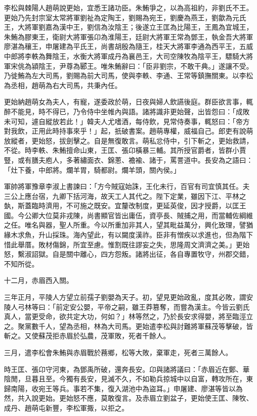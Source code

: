 \begin{pinyinscope}
李松與棘陽人趙萌說更始，宜悉王諸功臣。朱鮪爭之，以為高祖約，非劉氏不王。更始乃先封宗室太常將軍劉祉為定陶王，劉賜為宛王，劉慶為燕王，劉歙為元氏王，大將軍劉嘉為漢中王，劉信為汝陰王；後遂立王匡為比陽王，王鳳為宜城王，朱鮪為膠東王，衛尉大將軍張卬為淮陽王，廷尉大將軍王常為鄧王，執金吾大將軍廖湛為穰王，申屠建為平氏王，尚書胡殷為隨王，桂天大將軍李通為西平王，五威中郎將李軼為舞陰王，水衡大將軍成丹為襄邑王，大司空陳牧為陰平王，驃騎大將軍宋佻為潁陰王，尹尊為郾王。唯朱鮪辭曰：「臣非劉宗，不敢干典。」遂讓不受。乃徙鮪為左大司馬，劉賜為前大司馬，使與李軼、李通、王常等鎮撫關東。以李松為丞相，趙萌為右大司馬，共秉內任。

更始納趙萌女為夫人，有寵，遂委政於萌，日夜與婦人飲讌後庭。群臣欲言事，輒醉不能見，時不得已，乃令侍中坐帷內與語。諸將識非更始聲，出皆怨曰：「成敗未可知，遽自縱放若此！」韓夫人尤嗜酒，每侍飲，見常侍奏事，輒怒曰：「帝方對我飲，正用此時持事來乎！」起，扺破書案。趙萌專權，威福自己。郎吏有說萌放縱者，更始怒，拔劍擊之。自是無復敢言。萌私忿侍中，引下斬之，更始救請，不從。時李軼、朱鮪擅命山東，王匡、張卬橫暴三輔。其所授官爵者，皆群小賈豎，或有膳夫庖人，多著繡面衣、錦蔥、襜褕、諸于，罵詈道中。長安為之語曰：「灶下養，中郎將。爛羊胃，騎都尉。爛羊頭，關內侯。」

軍帥將軍豫章李淑上書諫曰：「方今賊寇始誅，王化未行，百官有司宜慎其任。夫三公上應台宿，九卿下括河海，故天工人其代之。陛下定業，雖因下江、平林之埶，斯蓋臨時濟用，不可施之既安。宜釐改制度，更延英俊，因才授爵，以匡王國。今公卿大位莫非戎陳，尚書顯官皆出庸伍，資亭長、賊捕之用，而當輔佐綱維之任。唯名與器，聖人所重。今以所重加非其人，望其毗益萬分，興化致理，譬猶緣木求魚，升山採珠。海內望此，有以闚度漢祚。臣非有憎疾以求進也，但為階下惜此舉厝。敗材傷錦，所宜至慮。惟割既往謬妄之失，思隆周文濟濟之美。」更始怒，繫淑詔獄。自是關中離心，四方怨叛。諸將出征，各自專置牧守，州郡交錯，不知所從。

十二月，赤眉西入關。

三年正月，平陵人方望立前孺子劉嬰為天子。初，望見更始政亂，度其必敗，謂安陵人弓林等曰：「前定安公嬰，平帝之嗣，雖王莽篡奪，而嘗為漢主。今皆云劉氏真人，當更受命，欲共定大功，何如？」林等然之，乃於長安求得嬰，將至臨涇立之。聚黨數千人，望為丞相，林為大司馬。更始遣李松與討難將軍蘇茂等擊破，皆斬之。又使蘇茂拒赤眉於弘農，茂軍敗，死者千餘人。

三月，遣李松會朱鮪與赤眉戰於蓩鄉，松等大敗，棄軍走，死者三萬餘人。

時王匡、張卬守河東，為鄧禹所破，還奔長安。卬與諸將議曰：「赤眉近在鄭、華陰閒，旦暮且至。今獨有長安，見滅不久，不如勒兵掠城中以自富，轉攻所在，東歸南陽，收宛王等兵。事若不集，復入湖池中為盜耳。」申屠建、廖湛等皆以為然，共入說更始。更始怒不應，莫敢復言。及赤眉立劉盆子，更始使王匡、陳牧、成丹、趙萌屯新豐，李松軍掫，以拒之。


\end{pinyinscope}
